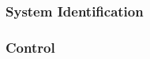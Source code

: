 

\subsubsection{System Identification} \label{sec:SystemID}
 
 
 \subsubsection{Control} \label{sec:Control}

 
